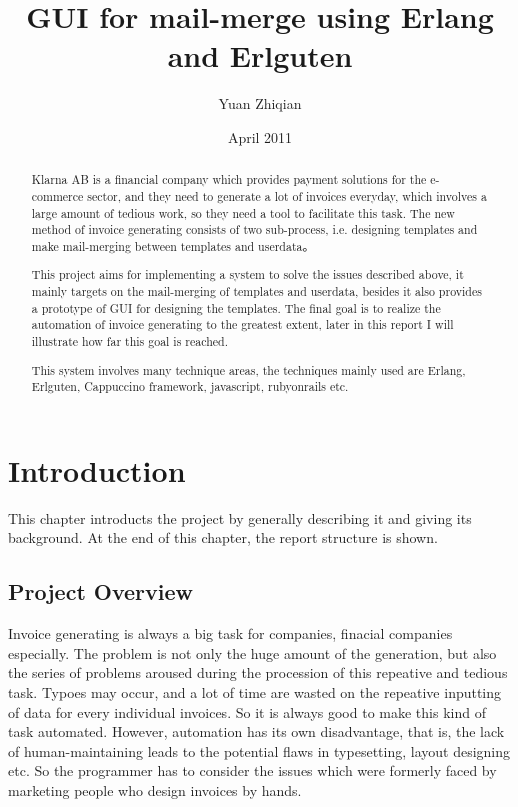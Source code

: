 \documentclass{report}
\begin{document}
\title{GUI for mail-merge using Erlang and Erlguten}
\author{Yuan Zhiqian}
\date{April 2011}
\maketitle
\begin{abstract}
  Klarna AB is a financial company which provides payment solutions for the e-commerce sector, and they need to generate a lot of invoices everyday, which involves a large amount of tedious work, so they need a tool to facilitate this task. The new method of invoice generating consists of two sub-process, i.e. designing templates and make mail-merging between templates and userdata。

  This project aims for implementing a system to solve the issues described above, it mainly targets on the mail-merging of templates and userdata, besides it also provides a prototype of GUI for designing the templates. The final goal is to realize the automation of invoice generating to the greatest extent, later in this report I will illustrate how far this goal is reached.

  This system involves many technique areas, the techniques mainly used are Erlang, Erlguten, Cappuccino framework, javascript, rubyonrails etc.
\end{abstract}

\tableofcontents

\chapter{Introduction}
  This chapter introducts the project by generally describing it and giving its background. At the end of this chapter, the report structure is shown.
\section{Project Overview}
  Invoice generating is always a big task for companies, finacial companies especially. The problem is not only the huge amount of the generation, but also the series of problems aroused during the procession of this repeative and tedious task. Typoes may occur, and a lot of time are wasted on the repeative inputting of data for every individual invoices. So it is always good to make this kind of task automated. However, automation has its own disadvantage, that is, the lack of human-maintaining leads to the potential flaws in typesetting, layout designing etc. So the programmer has to consider the issues which were formerly faced by marketing people who design invoices by hands. 
\end{document}

